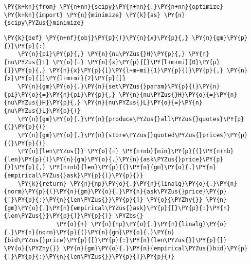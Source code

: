 \documentclass[9pt]{article}
\begin{document}
    \begin{tcolorbox}[breakable, size=fbox, boxrule=1pt, pad at break*=1mm,colback=cellbackground, colframe=cellborder]
\begin{Verbatim}[commandchars=\\\{\}]
\PY{k+kn}{from} \PY{n+nn}{scipy}\PY{n+nn}{.}\PY{n+nn}{optimize} \PY{k+kn}{import} \PY{n}{minimize} \PY{k}{as} \PY{n}{scipy\PYZus{}minimize}
\end{Verbatim}
\end{tcolorbox}

    \begin{tcolorbox}[breakable, size=fbox, boxrule=1pt, pad at break*=1mm,colback=cellbackground, colframe=cellborder]
\begin{Verbatim}[commandchars=\\\{\}]
\PY{k}{def} \PY{n+nf}{obj}\PY{p}{(}\PY{n}{x}\PY{p}{,} \PY{n}{gm}\PY{p}{)}\PY{p}{:}
    \PY{n}{pi}\PY{p}{,} \PY{n}{nu\PYZus{}H}\PY{p}{,} \PY{n}{nu\PYZus{}L} \PY{o}{=} \PY{n}{x}\PY{p}{[}\PY{l+m+mi}{0}\PY{p}{]}\PY{p}{,} \PY{n}{x}\PY{p}{[}\PY{l+m+mi}{1}\PY{p}{]}\PY{p}{,} \PY{n}{x}\PY{p}{[}\PY{l+m+mi}{2}\PY{p}{]}
    \PY{n}{gm}\PY{o}{.}\PY{n}{set\PYZus{}param}\PY{p}{(}\PY{n}{pi}\PY{o}{=}\PY{n}{pi}\PY{p}{,} \PY{n}{nu\PYZus{}H}\PY{o}{=}\PY{n}{nu\PYZus{}H}\PY{p}{,} \PY{n}{nu\PYZus{}L}\PY{o}{=}\PY{n}{nu\PYZus{}L}\PY{p}{)}
    \PY{n}{gm}\PY{o}{.}\PY{n}{produce\PYZus{}all\PYZus{}quotes}\PY{p}{(}\PY{p}{)}
    \PY{n}{gm}\PY{o}{.}\PY{n}{store\PYZus{}quoted\PYZus{}prices}\PY{p}{(}\PY{p}{)}
    \PY{n}{len\PYZus{}} \PY{o}{=} \PY{n+nb}{min}\PY{p}{(}\PY{n+nb}{len}\PY{p}{(}\PY{n}{gm}\PY{o}{.}\PY{n}{ask\PYZus{}price}\PY{p}{)}\PY{p}{,} \PY{n+nb}{len}\PY{p}{(}\PY{n}{gm}\PY{o}{.}\PY{n}{empirical\PYZus{}ask}\PY{p}{)}\PY{p}{)}
    \PY{k}{return} \PY{n}{np}\PY{o}{.}\PY{n}{linalg}\PY{o}{.}\PY{n}{norm}\PY{p}{(}\PY{n}{gm}\PY{o}{.}\PY{n}{ask\PYZus{}price}\PY{p}{[}\PY{p}{:}\PY{n}{len\PYZus{}}\PY{p}{]} \PY{o}{\PYZhy{}} \PY{n}{gm}\PY{o}{.}\PY{n}{empirical\PYZus{}ask}\PY{p}{[}\PY{p}{:}\PY{n}{len\PYZus{}}\PY{p}{]}\PY{p}{)} \PYZbs{}
               \PY{o}{+} \PY{n}{np}\PY{o}{.}\PY{n}{linalg}\PY{o}{.}\PY{n}{norm}\PY{p}{(}\PY{n}{gm}\PY{o}{.}\PY{n}{bid\PYZus{}price}\PY{p}{[}\PY{p}{:}\PY{n}{len\PYZus{}}\PY{p}{]} \PY{o}{\PYZhy{}} \PY{n}{gm}\PY{o}{.}\PY{n}{empirical\PYZus{}bid}\PY{p}{[}\PY{p}{:}\PY{n}{len\PYZus{}}\PY{p}{]}\PY{p}{)}
\end{Verbatim}
\end{tcolorbox}
\end{document}
